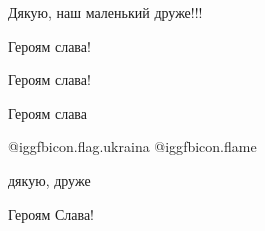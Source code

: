  
Дякую, наш маленький друже!!!💖

 
Героям слава!

 
Героям слава!

 
Героям слава

 
@igg{fbicon.flag.ukraina}
 @igg{fbicon.flame} 

 
дякую, друже

 
Героям Слава!

 
